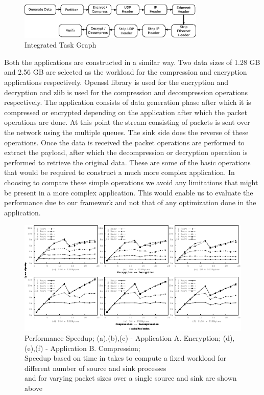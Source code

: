 \documentclass[conference]{IEEEtran}
\begin{document}
\begin{figure}[htb]
\centering
\includegraphics[width=3.5in]{enc-dec}
\caption{ Integrated Task Graph  }
\label{fig-app-graph}
\end{figure}

Both the applications are constructed in a similar way. Two data sizes of 1.28 GB and 2.56 GB are selected as the workload for the compression and encryption applications respectively. Openssl library is used for the encryption and decryption and zlib is used for the compression and decompression operations respectively. The application consists of data generation phase after which it is compressed or encrypted depending on the application after which the packet operations are done. At this point the stream consisting of packets is sent over the network using the multiple queues. The sink side does the reverse of these operations. Once the data is received the packet operations are performed to extract the payload, after which the decompression or decryption operation is performed to retrieve the original data. These are some of the basic operations that would be required to construct a much more complex application. In choosing to compare these simple operations we avoid any limitations that might be present in a more complex application. This would enable us to evaluate the performance due to our framework and not that of any optimization done in the application.\\

\begin{figure}[tb]
\centering
\includegraphics[width=7in]{result}
\caption{Performance Speedup; (a),(b),(c) - Application A. Encryption; (d),(e),(f) - Application B. Compression;\\ \newline Speedup based on time in takes to compute a fixed workload for different number of source and sink processes\\ \newline and for varying packet sizes over a single source and sink are shown above}
\label{fig-res}
\end{figure}
\end{document}

